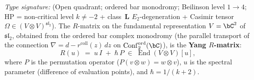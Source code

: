 \begin{theorem}
\label{thm:yang-r-matrix}
\emph{Type signature:} (Open quadrant; ordered bar monodromy;
Beilinson level $1\!\rightarrow\!4$; HP = non-critical level
$k\neq -2$ + class~$\mathbf L$ $E_2$-degeneration + Casimir tensor
$\Omega \in (V \otimes V)^{\mathfrak{sl}_2}$).
The $R$-matrix on the fundamental representation $V=\bC^2$ of
$\mathfrak{sl}_2$, obtained from the ordered bar complex monodromy
\textup{(}the parallel transport of the connection
$\nabla=d-r^{\mathrm{coll}}(z)\,dz$ on
$\operatorname{Conf}_2^{\mathrm{ord}}(\bC)$\textup{)}, is the
\textbf{Yang $R$-matrix}:
\begin{equation}\label{eq:yang-r-matrix}
R(u)\;=\;u\,I\;+\;\hbar\,P
\;\in\;\operatorname{End}(V\otimes V)[u],
\end{equation}
where $P$ is the permutation operator ($P(v\otimes w)=w\otimes v$),
$u$ is the spectral parameter \textup{(}difference of evaluation
points\textup{)}, and $\hbar=1/(k+2)$.
\end{theorem}

